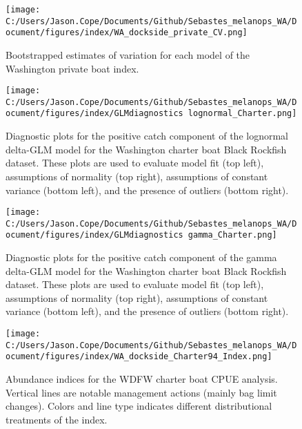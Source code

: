 \documentclass[11pt,
  letterpaper,
]{article}
\begin{document}
\pagebreak

\begin{figure}
{\centering
\texttt{[image: C:/Users/Jason.Cope/Documents/Github/Sebastes\_melanops\_WA/Document/figures/index/WA\_dockside\_private\_CV.png]}
}
\caption{Bootstrapped estimates of variation for each model of the Washington private boat index.\label{fig:private-CVs}}
\end{figure}

\pagebreak

\begin{figure}
{\centering
\texttt{[image: C:/Users/Jason.Cope/Documents/Github/Sebastes\_melanops\_WA/Document/figures/index/GLMdiagnostics lognormal\_Charter.png]}
}
\caption{Diagnostic plots for the positive catch component of the lognormal delta-GLM model for the Washington charter boat Black Rockfish dataset.  These plots are used to evaluate model fit (top left), assumptions of normality (top right), assumptions of constant variance (bottom left), and the presence of outliers (bottom right).\label{fig:charter-log-diags}}
\end{figure}

\pagebreak

\begin{figure}
{\centering
\texttt{[image: C:/Users/Jason.Cope/Documents/Github/Sebastes\_melanops\_WA/Document/figures/index/GLMdiagnostics gamma\_Charter.png]}
}
\caption{Diagnostic plots for the positive catch component of the gamma delta-GLM model for the Washington charter boat Black Rockfish dataset.  These plots are used to evaluate model fit (top left), assumptions of normality (top right), assumptions of constant variance (bottom left), and the presence of outliers (bottom right).\label{fig:charter-gam-diags}}
\end{figure}

\pagebreak

\begin{figure}
{\centering
\texttt{[image: C:/Users/Jason.Cope/Documents/Github/Sebastes\_melanops\_WA/Document/figures/index/WA\_dockside\_Charter94\_Index.png]}
}
\caption{Abundance indices for the WDFW charter boat CPUE analysis. Vertical lines are notable management actions (mainly bag limit changes). Colors and line type indicates different distributional treatments of the index.\label{fig:charter-index}}
\end{figure}
\end{document}
